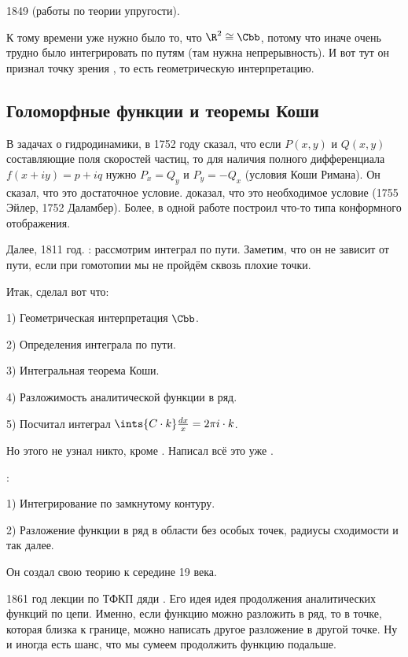 \documentclass[a4paper,oneside,fleqn,10pt]{article}
\begin{document}
1849  (работы по теории упругости).

К тому времени  уже нужно было то, что $\R^2 \cong \Cbb$, потому что иначе
очень трудно было интегрировать по путям (там нужна непрерывность).
И вот тут он признал точку зрения , то есть геометрическую интерпретацию.

\subsection{Голоморфные функции и теоремы Коши}

В задачах о гидродинамики, в 1752 году  сказал,
что если $P(x,y)$ и $Q(x,y)$ составляющие поля скоростей частиц, то
для наличия полного дифференциала $f(x + iy) = p + i q$
нужно $P_x = Q_y$ и $P_y = -Q_x$ (условия Коши Римана).
Он сказал, что это достаточное условие.  доказал, что
это необходимое условие (1755 Эйлер, 1752 Даламбер).
Более, в одной работе  построил что-то типа конформного отображения.

Далее, 1811 год.  : рассмотрим интеграл по пути.
Заметим, что он не зависит от пути, если при гомотопии мы не пройдём сквозь плохие
точки.

Итак,  сделал вот что:

1) Геометрическая интерпретация $\Cbb$.

2) Определения интеграла по пути.

3) Интегральная теорема Коши.

4) Разложимость аналитической функции в ряд.

5) Посчитал интеграл $\ints{C\cdot k} \frac{dx}{x} = 2\pi i \cdot k$.

Но этого не узнал никто, кроме . Написал всё это уже .

:

1) Интегрирование по замкнутому контуру.

2) Разложение функции в ряд в области без особых точек, радиусы сходимости и так далее.

Он создал свою теорию к середине 19 века.

1861 год лекции по ТФКП дяди . Его идея идея продолжения
аналитических функций по цепи.
Именно, если функцию можно разложить в ряд, то в точке, которая близка к границе,
можно написать другое разложение в другой точке. Ну и иногда есть шанс, что мы сумеем
продолжить функцию подальше.
\end{document}
